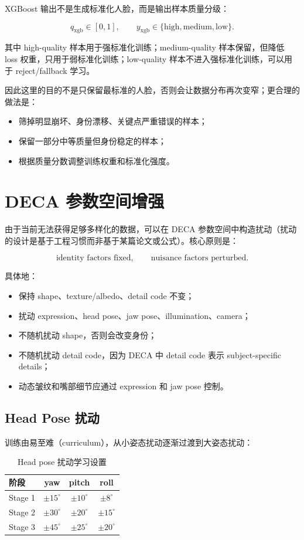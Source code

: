 \documentclass[UTF8,12pt,fontset=fandol]{ctexart}
\begin{document}
XGBoost 输出不是生成标准化人脸，而是输出样本质量分级：

\[
q_{\text{xgb}}\in[0,1],
\qquad
y_{\text{xgb}}\in\{\text{high},\text{medium},\text{low}\}.
\]

其中 high-quality 样本用于强标准化训练；medium-quality 样本保留，但降低 loss 权重，只用于弱标准化训练；low-quality 样本不进入强标准化训练，可以用于 reject/fallback 学习。

因此这里的目的不是只保留最标准的人脸，否则会让数据分布再次变窄；更合理的做法是：

\begin{itemize}
    \item 筛掉明显崩坏、身份漂移、关键点严重错误的样本；
    \item 保留一部分中等质量但身份稳定的样本；
    \item 根据质量分数调整训练权重和标准化强度。
\end{itemize}

\section{DECA 参数空间增强}

由于当前无法获得足够多样化的数据，可以在 DECA 参数空间中构造扰动（扰动的设计是基于工程习惯而非基于某篇论文或公式）。核心原则是：

\[
\text{identity factors fixed},\qquad
\text{nuisance factors perturbed}.
\]

具体地：

\begin{itemize}
    \item 保持 shape、texture/albedo、detail code 不变；
    \item 扰动 expression、head pose、jaw pose、illumination、camera；
    \item 不随机扰动 shape，否则会改变身份；
    \item 不随机扰动 detail code，因为 DECA 中 detail code 表示 subject-specific details；
    \item 动态皱纹和嘴部细节应通过 expression 和 jaw pose 控制。
\end{itemize}

\subsection{Head Pose 扰动}

训练由易至难（curriculum），从小姿态扰动逐渐过渡到大姿态扰动：

\begin{table}[h]
\centering
\begin{tabular}{lccc}
\toprule
阶段 & yaw & pitch & roll \\
\midrule
Stage 1 & \(\pm 15^\circ\) & \(\pm 10^\circ\) & \(\pm 8^\circ\) \\
Stage 2 & \(\pm 30^\circ\) & \(\pm 20^\circ\) & \(\pm 15^\circ\) \\
Stage 3 & \(\pm 45^\circ\) & \(\pm 25^\circ\) & \(\pm 20^\circ\) \\
\bottomrule
\end{tabular}
\caption{Head pose 扰动学习设置}
\end{table}
\end{document}
